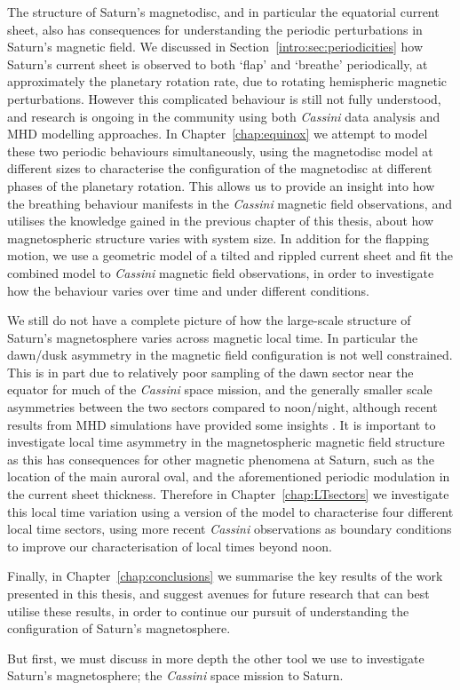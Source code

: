 The structure of Saturn's magnetodisc, and in particular the equatorial current sheet, also has consequences for understanding the periodic perturbations in Saturn's magnetic field. We discussed in Section~\ref{intro:sec:periodicities} how Saturn's current sheet is observed to both `flap' and `breathe' periodically, at approximately the planetary rotation rate, due to rotating hemispheric magnetic perturbations. However this complicated behaviour is still not fully understood, and research is ongoing in the community using both \textit{Cassini} data analysis and MHD modelling approaches. In Chapter~\ref{chap:equinox} we attempt to model these two periodic behaviours simultaneously, using the \citet{achilleos2010a} magnetodisc model at different sizes to characterise the configuration of the magnetodisc at different phases of the planetary rotation. This allows us to provide an insight into how the breathing behaviour manifests in the \textit{Cassini} magnetic field observations, and utilises the knowledge gained in the previous chapter of this thesis, about how magnetospheric structure varies with system size. In addition for the flapping motion, we use a geometric model of a tilted and rippled current sheet and fit the combined model to \textit{Cassini} magnetic field observations, in order to investigate how the behaviour varies over time and under different conditions.

We still do not have a complete picture of how the large-scale structure of Saturn's magnetosphere varies across magnetic local time. In particular the dawn/dusk asymmetry in the magnetic field configuration is not well constrained. This is in part due to relatively poor sampling of the dawn sector near the equator for much of the \textit{Cassini} space mission, and the generally smaller scale asymmetries between the two sectors compared to noon/night, although recent results from MHD simulations have provided some insights \citep[e.g.][]{jia2016}. It is important to investigate local time asymmetry in the magnetospheric magnetic field structure as this has consequences for other magnetic phenomena at Saturn, such as the location of the main auroral oval, and the aforementioned periodic modulation in the current sheet thickness. Therefore in Chapter~\ref{chap:LTsectors} we investigate this local time variation using a version of the \citet{achilleos2010a} model to characterise four different local time sectors, using more recent \textit{Cassini} observations as boundary conditions to improve our characterisation of local times beyond noon.

Finally, in Chapter~\ref{chap:conclusions} we summarise the key results of the work presented in this thesis, and suggest avenues for future research that can best utilise these results, in order to continue our pursuit of understanding the configuration of Saturn's magnetosphere.

But first, we must discuss in more depth the other tool we use to investigate Saturn's magnetosphere; the \textit{Cassini} space mission to Saturn.